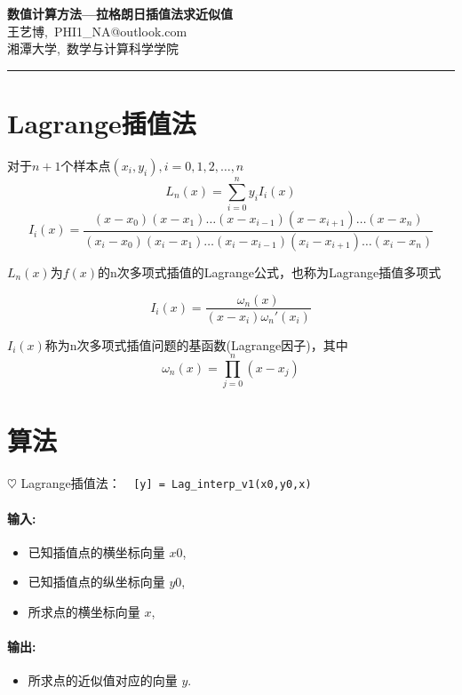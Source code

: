\documentclass{xtupaper}
\begin{document}
	\begin{center}
		\LARGE
		\textbf{数值计算方法---拉格朗日插值法求近似值}\\
		\vspace{0.5em}
		\large
		王艺博,\ PHI1\_NA@outlook.com\\
		湘潭大学,\ 数学与计算科学学院
	\end{center}
	\rule[0.1\baselineskip]{\textwidth}{0.5pt}
	
	
	\section{Lagrange插值法} 
对于$n+1$个样本点$ (x_i,y_i),i=0,1,2,\dots
,n  $
\[L_n(x)=\sum_{i=0}^{n}y_iI_i(x)\]
\[I_i(x)=\frac{(x-x_0)(x-x_1)\dots(x-x_{i-1})(x-x_{i+1})\dots(x-x_n)}{(x_i-x_0)(x_i-x_1)\dots(x_i-x_{i-1})(x_i-x_{i+1})\dots(x_i-x_n)}\]

$ L_n(x) $为$ f(x) $的n次多项式插值的Lagrange公式，也称为Lagrange插值多项式

\[I_i(x)=\frac{\omega_n(x)}{(x-x_i)\omega_n'(x_i)}\]

$ I_i(x) $称为n次多项式插值问题的基函数(Lagrange因子)，其中
\[\omega_n(x)=\prod_{j=0}^{n}(x-x_j)\]
\newpage
	\section{算法}
	
	$\heartsuit$ Lagrange插值法：\verb|  [y] = Lag_interp_v1(x0,y0,x)|
	
	\paragraph{输入:} 
	
	\begin{itemize}
		\item  已知插值点的横坐标向量 $x0$,
		
		\item 已知插值点的纵坐标向量 $y0$,
		
		\item 所求点的横坐标向量 $x$,
		
	\end{itemize}
	
	\paragraph{输出:}
	\begin{itemize}
		\item 所求点的近似值对应的向量 $y$.
	\end{itemize}
\end{document}
